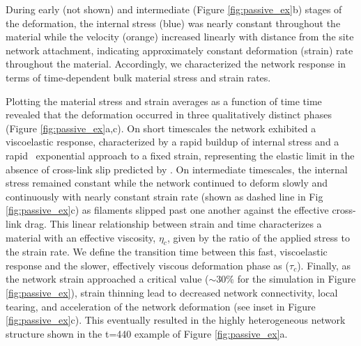 \documentclass[10pt,letterpaper]{article}
\begin{document}
During early (not shown) and intermediate (Figure \ref{fig:passive_ex}b) stages of the deformation, the internal stress (blue) was nearly constant throughout the material while the velocity (orange) increased linearly with distance from the site network attachment, indicating approximately constant deformation (strain) rate throughout the material.  Accordingly, we characterized the network response in terms of time-dependent bulk material stress and strain rates.

Plotting the material stress and strain averages as a function of time time revealed that the deformation occurred in three qualitatively distinct phases (Figure \ref{fig:passive_ex}a,c). On short timescales the network exhibited a viscoelastic response, characterized by a rapid buildup of internal stress and a rapid ~exponential approach to a fixed strain, representing the elastic limit in the absence of cross-link slip predicted by  \cite{theo_hlm}. On intermediate timescales, the internal stress remained constant while the network continued to deform slowly and continuously with nearly constant strain rate (shown as dashed line in Fig \ref{fig:passive_ex}c) as filaments slipped past one another against the effective cross-link drag. This linear relationship between strain and time characterizes a material with an effective viscosity, $\eta_c$, given by the ratio of the applied stress to the strain rate.  We define the transition time between this fast, viscoelastic response and the slower, effectively viscous deformation phase as ($\tau_c$).  Finally, as the network strain approached a critical value ($\sim 30\%$ for the simulation in Figure \ref{fig:passive_ex}), strain thinning lead to decreased network connectivity, local tearing, and acceleration of the network deformation (see inset in Figure \ref{fig:passive_ex}c). This eventually resulted in the highly heterogeneous network structure shown in the t=440 example of Figure \ref{fig:passive_ex}a. 
\end{document}
